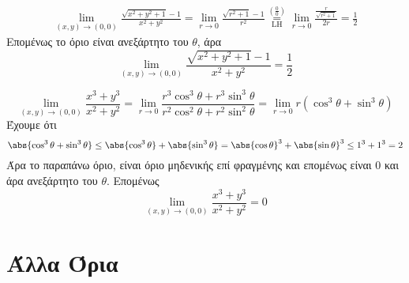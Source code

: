 \begin{example}
  \begin{align*}
    \lim\limits_{(x,y)\to (0, 0)} \frac{\sqrt{x^{2}+y^{2}+1}-1}
    {x^{2}+y^{2}} = \lim_{r \to 0} \frac{\sqrt{r^{2}+1} -1}{r^{2}} 
    \overset{\left(\frac{0}{0}\right)}{\underset{\text{LH}}{=}} 
    \lim_{r \to 0} \frac{\frac{r}{\sqrt{r^{2}+1}}}{2r} = \frac{1}{2}
  \end{align*}
  Επομένως το όριο είναι ανεξάρτητο του $\theta$, άρα 
  \[
    \lim\limits_{(x,y)\to (0, 0)} 
    \frac{\sqrt{x^{2}+y^{2}+1} -1}{x^{2}+y^{2}} = \frac{1}{2} 
  \] 
\end{example}

\begin{example}
  \[ 
    \lim\limits_{(x,y)\to (0, 0)} \frac{x^{3}+y^{3}}{x^{2}+y^{2}} = \lim_{r \to 0}
    \frac{r^{3} \cos^{3}{\theta} + r^{3} \sin^{3}{\theta}}{r^{2} \cos^{2}{\theta} +
    r^{2} \sin^{2}{\theta}} = \lim_{r \to 0} 
    r(\cos^{3}{\theta} + \sin^{3}{\theta}) 
  \] 
  Έχουμε ότι
  \[
    \abs{\cos^{3}{\theta} + \sin^{3}{\theta}} \leq \abs{\cos^{3}{\theta}} + 
    \abs{\sin^{3}{\theta}} = \abs{\cos{\theta} }^{3} + \abs{\sin{\theta} }^{3} \leq 
    1^{3} + 1^{3} = 2
  \] 
  Άρα το παραπάνω όριο, είναι όριο μηδενικής επί φραγμένης και επομένως είναι 0 και άρα
  ανεξάρτητο του $\theta$. Επομένως 
  \[
    \lim\limits_{(x,y)\to (0, 0)} \frac{x^{3}+y^{3}}{x^{2}+y^{2}} = 0 
  \] 
\end{example}

\section{Άλλα Όρια}

